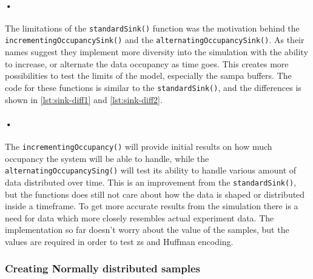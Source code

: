 \documentclass[a4paper, 12pt]{report}
\newcommand{\codeword}[1]{\texttt{#1}}
\begin{document}
\begin{minipage}{\linewidth}

\end{minipage}

\paragraph{•}
The limitations of the \codeword{standardSink()} function was the motivation behind the \codeword{incrementingOccupancySink()} and the \codeword{alternatingOccupancySink()}.
As their names suggest they implement more diversity into the simulation with the ability to increase, or alternate the data occupancy as time goes.
This creates more possibilities to test the limits of the model, especially the \gls{sampa} buffers.
The code for these functions is similar to the \codeword{standardSink()}, and the differences is shown in \ref{lst:sink-diff1} and \ref{lst:sink-diff2}.

\begin{minipage}{\linewidth}


\end{minipage}

\paragraph{•} 
The \codeword{incrementingOccupancy()} will provide initial results on how much occupancy the system will be able to handle, while the \codeword{alternatingOccupancySing()} will test its ability to handle various amount of data distributed over time.
This is an improvement from the \codeword{standardSink()}, but the functions does still not care about how the data is shaped or distributed inside a timeframe.
To get more accurate results from the simulation there is a need for data which more closely resembles actual experiment data.
The implementation so far doesn't worry about the value of the samples, but the values are required in order to test \gls{zs} and Huffman encoding.

\subsubsection{Creating Normally distributed samples}
\end{document}
